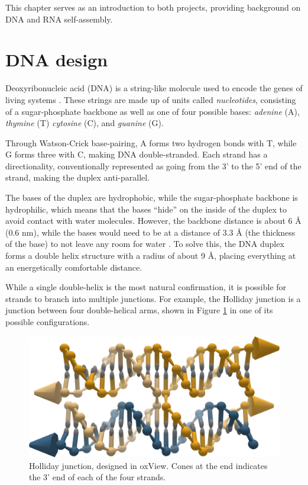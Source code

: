 This chapter serves as an introduction to both projects, providing background on DNA and RNA self-assembly.



\section{DNA design}
Deoxyribonucleic acid (DNA) is a string-like molecule used to encode the genes of living systems \cite{calladine1997understanding}. These strings are made up of units called \emph{nucleotides}, consisting of a sugar-phosphate backbone as well as one of four possible bases: \emph{adenine} (A), \emph{thymine} (T) \emph{cytosine} (C), and \emph{guanine} (G).

Through Watson-Crick base-pairing, A forms two hydrogen bonds with T, while G forms three with C, making DNA double-stranded. Each strand has a directionality, conventionally represented as going from the 3' to the 5' end of the strand, making the duplex anti-parallel.

The bases of the duplex are hydrophobic, while the sugar-phosphate backbone is hydrophilic, which means that the bases ``hide'' on the inside of the duplex to avoid contact with water molecules. However, the backbone distance is about 6 Å (0.6 nm), while the bases would need to be at a distance of 3.3 Å (the thickness of the base) to not leave any room for water \cite{calladine1997understanding}. To solve this, the DNA duplex forms a double helix structure with a radius of about 9 Å, placing everything at an energetically comfortable distance.

While a single double-helix is the most natural confirmation, it is possible for strands to branch into multiple junctions. For example, the Holliday junction is a junction between four double-helical arms, shown in Figure \ref{fig:holliday} in one of its possible configurations.

\begin{figure}
    \centering\includegraphics[width=\textwidth]{figures/holliday.png}
    \caption{Holliday junction, designed in oxView. Cones at the end indicates the 3' end of each of the four strands.}
    \label{fig:holliday}
\end{figure}

